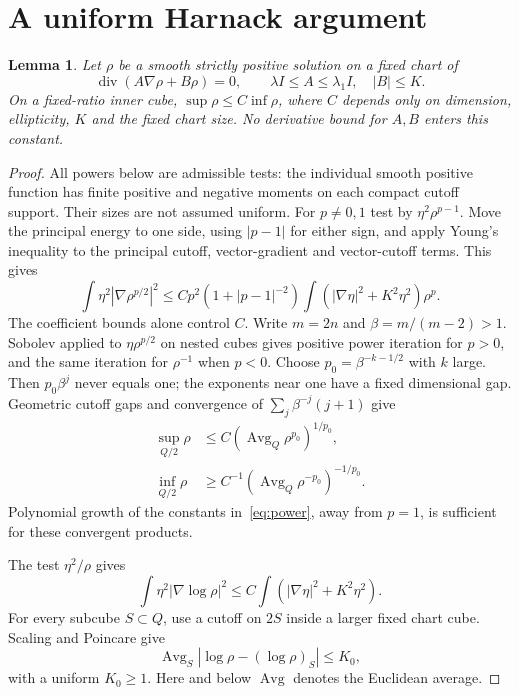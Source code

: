 \documentclass[11pt]{article}
\newtheorem{lemma}[theorem]{Lemma}
\theoremstyle{remark}\newtheorem{remark}[theorem]{Remark}
\newcommand{\avg}{\mathop{\mathrm{Avg}}}
\begin{document}
\section{A uniform Harnack argument}
\begin{lemma}\label{lem:Harnack}
Let $\rho$ be a smooth strictly positive solution on a fixed chart of
\[
 \operatorname{div}(A\nabla\rho+B\rho)=0,
 \qquad\lambda I\leq A\leq\lambda_1 I,\quad |B|\leq K.
\]
On a fixed-ratio inner cube,
$\sup\rho\leq C\inf\rho$, where $C$ depends only on
dimension, ellipticity, $K$ and the fixed chart size.
No derivative bound for $A,B$ enters this constant.
\end{lemma}
\begin{proof}
All powers below are admissible tests: the individual smooth
positive function has finite positive and negative moments on
each compact cutoff support. Their sizes are not assumed uniform.
For $p\ne0,1$ test by $\eta^2\rho^{p-1}$. Move the principal
energy to one side, using $|p-1|$ for either sign, and apply
Young's inequality to the principal cutoff, vector-gradient and
vector-cutoff terms. This gives
\begin{equation}\label{eq:power}
 \int\eta^2|\nabla\rho^{p/2}|^2
 \leq Cp^2(1+|p-1|^{-2})
          \int(|\nabla\eta|^2+K^2\eta^2)\rho^p.
\end{equation}
The coefficient bounds alone control $C$.
Write $m=2n$ and $\beta=m/(m-2)>1$.
Sobolev applied to $\eta\rho^{p/2}$ on nested cubes gives positive
power iteration for $p>0$, and the same iteration for $\rho^{-1}$
when $p<0$. Choose $p_0=\beta^{-k-1/2}$ with $k$ large.
Then $p_0\beta^j$ never equals one; the exponents near one have
a fixed dimensional gap. Geometric cutoff gaps and convergence
of $\sum_j\beta^{-j}(j+1)$ give
\begin{align}
 \sup_{Q/2}\rho&\leq C(\avg_Q\rho^{p_0})^{1/p_0},\label{eq:sup}\\
 \inf_{Q/2}\rho&\geq C^{-1}(\avg_Q\rho^{-p_0})^{-1/p_0}.
                                                        \label{eq:inf}
\end{align}
Polynomial growth of the constants in~\eqref{eq:power}, away
from $p=1$, is sufficient for these convergent products.

The test $\eta^2/\rho$ gives
\[
 \int\eta^2|\nabla\log\rho|^2
       \leq C\int(|\nabla\eta|^2+K^2\eta^2).
\]
For every subcube $S\subset Q$, use a cutoff on $2S$ inside a
larger fixed chart cube. Scaling and Poincare give
\[
 \avg_S|\log\rho-(\log\rho)_S|\leq K_0,
\]
with a uniform $K_0\geq1$.
Here and below $\avg$ denotes the Euclidean average.


\end{proof}
\end{document}
